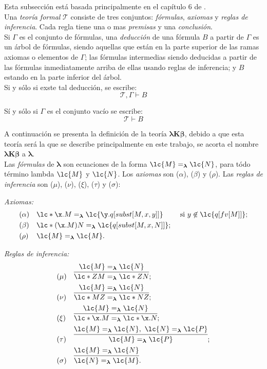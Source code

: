 Esta subsección está basada principalmente en el capítulo 6 de
\cite{HindleySeldin:LambdaCalculusAndCombinators}. \\

Una \emph{teoría formal} \(\mathcal{T}\) consiste de tres conjuntos:
\emph{fórmulas}, \emph{axiomas} y \emph{reglas de inferencia}. Cada regla
tiene una o mas \emph{premisas} y una \emph{conclusión}. \\

Si \(\Gamma\) es el conjunto de fórmulas, una \emph{deducción} de una fórmula
\(B\) a partir de \(\Gamma\) es un árbol de fórmulas, siendo aquellas que están
en la parte superior de las ramas axiomas o elementos de \(\Gamma\); las
fórmulas intermedias siendo deducidas a partir de las fórmulas inmediatamente
arriba de ellas usando reglas de inferencia; y \(B\) estando en la parte
inferior del árbol. \\

Si y sólo si exste tal deducción, se escribe:
\[\mathcal{T},\Gamma \vdash B\]

Sí y sólo si \(\Gamma\) es el conjunto vacío se escribe:
\[\mathcal{T} \vdash B\]

A continuación se presenta la definición de la teoría \(\boldsymbol{\lambda K
  \beta}\), debido a que esta teoría será la que se describe principalmente en
este trabajo, se acorta el nombre \(\boldsymbol{\lambda K \beta}\) a
\(\boldsymbol{\lambda}\). \\

Las \emph{fórmulas} de \(\boldsymbol{\lambda}\) son ecuaciones de la
forma \(\lc{M}=_{\boldsymbol{\lambda}}\lc{N}\), para tódo término lambda
\(\lc{M}\) y \(\lc{N}\). Los \emph{axiomas} son (\(\alpha\)), (\(\beta\)) y
(\(\rho\)). Las \emph{reglas de inferencia} son (\(\mu\)), (\(\nu\)), (\(\xi\)),
(\(\tau\)) y (\(\sigma\)):

\emph{Axiomas:}
\begin{align*}
  &(\alpha) & & \lc*{\x.M}=_{\boldsymbol{\lambda}}\lc{\y.q[subst[M,x,y]]} & &\text{ si } y \not\in \lc{q[fv[M]]}; \\
  &(\beta)  & & \lc*{(\x.M)N}=_{\boldsymbol{\lambda}}\lc{q[subst[M,x,N]]}; \\
  &(\rho)   & & \lc{M}=_{\boldsymbol{\lambda}}\lc{M}.
\end{align*}

\emph{Reglas de inferencia:}
\begin{align*}
  &(\mu)    & & \infer{\lc*{Z M}=_{\boldsymbol{\lambda}}\lc*{Z N}}{\lc{M}=_{\boldsymbol{\lambda}}\lc{N}}; \\
  &(\nu)    & & \infer{\lc*{M Z}=_{\boldsymbol{\lambda}}\lc*{N Z}}{\lc{M}=_{\boldsymbol{\lambda}}\lc{N}}; \\
  &(\xi)    & & \infer{\lc*{\x.M}=_{\boldsymbol{\lambda}}\lc*{\x.N}}{\lc{M}=_{\boldsymbol{\lambda}}\lc{N}}; \\
  &(\tau)   & & \infer{\lc{M}=_{\boldsymbol{\lambda}}\lc{P}}{\lc{M}=_{\boldsymbol{\lambda}}\lc{N},\ \lc{N}=_{\boldsymbol{\lambda}}\lc{P}}; \\
  &(\sigma) & & \infer{\lc{N}=_{\boldsymbol{\lambda}}\lc{M}}{\lc{M}=_{\boldsymbol{\lambda}}\lc{N}}.
\end{align*}

